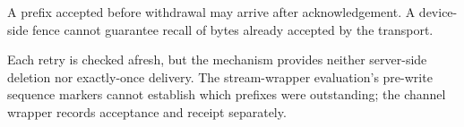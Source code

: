 \begin{proposition}[No recall]\label{prop:recall}
A prefix accepted before withdrawal may arrive after acknowledgement. A device-side
fence cannot guarantee recall of bytes already accepted by the transport.
\end{proposition}

Each retry is checked afresh, but the mechanism provides neither server-side deletion nor
exactly-once delivery. The stream-wrapper evaluation's pre-write sequence markers cannot establish which
prefixes were outstanding; the channel wrapper records acceptance and receipt separately.
